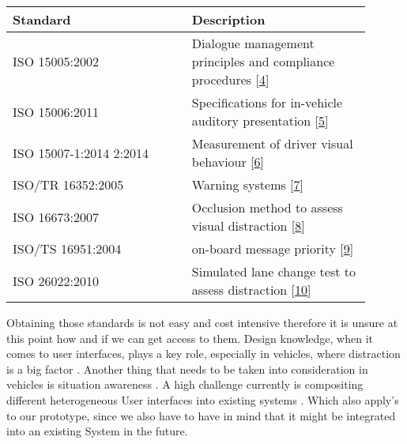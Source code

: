 \documentclass[hidelinks]{sig-alternate}
\begin{document}
\noindent
\def\arraystretch{1.2}
\begin{tabular}{p{0.45\linewidth} | p{0.45\linewidth}}
Standard & Description \\\hline
ISO 15005:2002 & Dialogue management principles and compliance procedures [\href{http://www.iso.org/iso/home/store/catalogue_tc/catalogue_detail.htm?csnumber=34085}{4}]\\\hline
ISO 15006:2011 & Specifications for in-vehicle auditory presentation [\href{http://www.iso.org/iso/home/store/catalogue_tc/catalogue_detail.htm?csnumber=55322}{5}]\\\hline
ISO 15007-1:2014 2:2014 & Measurement of driver visual behaviour [\href{http://www.iso.org/iso/home/store/catalogue_tc/catalogue_detail.htm?csnumber=63220}{6}]\\\hline
ISO/TR 16352:2005 & Warning systems [\href{http://www.iso.org/iso/home/store/catalogue_tc/catalogue_detail.htm?csnumber=37859}{7}]\\\hline
ISO 16673:2007 & Occlusion method to assess visual distraction [\href{http://www.iso.org/iso/home/store/catalogue_tc/catalogue_detail.htm?csnumber=38035\#5}{8}]\\\hline
ISO/TS 16951:2004 & on-board message priority [\href{http://www.iso.org/iso/home/store/catalogue_tc/catalogue_detail.htm?csnumber=29024}{9}] \\\hline
ISO 26022:2010 & Simulated lane change test to assess distraction [\href{http://www.iso.org/iso/home/store/catalogue_tc/catalogue_detail.htm?csnumber=43361}{10}]
\end{tabular}
Obtaining those standards is not easy and cost intensive therefore it is unsure at this point how and if we can get access to them. Design knowledge, when it comes to  user interfaces, plays a key role, especially in vehicles, where distraction is a big factor  \cite{Developmentofanautomotiveuserinterfacedesignknowledgesystem}.
 Another thing that needs to be taken into consideration in vehicles is situation awareness \cite{Skrypchuk2016}. A high challenge currently is compositing different heterogeneous User interfaces into existing systems \cite{Holstein2015}. Which also apply's to our prototype, since we also have to have in mind that it might be integrated into an existing System in the future.




\end{document}
